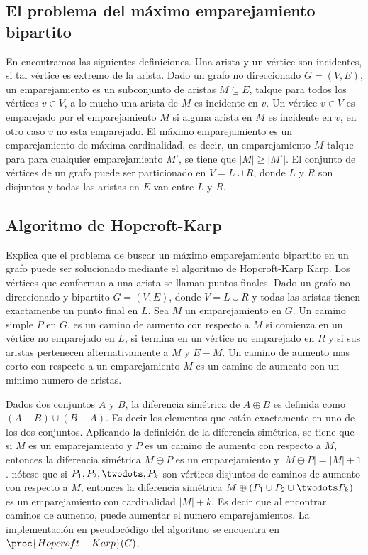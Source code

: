 \subsection{El problema del máximo emparejamiento bipartito}
En \cite{Cormen2009} encontramos las siguientes definiciones. Una arista y un vértice son incidentes, si tal vértice es extremo de la arista. Dado un grafo no direccionado $G=(V,E)$, un emparejamiento es un subconjunto de aristas $M \subseteq E$, talque para todos los vértices $v \in V$, a lo mucho una arista de $M$ es incidente en $v$. Un vértice $v \in V$ es emparejado por el emparejamiento $M$ si alguna arista en $M$ es incidente en $v$, en otro caso $v$ no esta emparejado. El máximo emparejamiento es un emparejamiento de máxima cardinalidad, es decir, un emparejamiento $M$ talque para para cualquier emparejamiento ${M}'$, se tiene que $|M| \geq |{M}'|$. El conjunto de vértices de un grafo puede ser particionado en $V=L \cup R$, donde $L$ y $R$ son disjuntos y todas las aristas en $E$ van entre $L$ y $R$.



\subsection{Algoritmo de Hopcroft-Karp}
\cite{Cormen2009} Explica que el problema de buscar un máximo emparejamiento bipartito en un grafo puede ser solucionado mediante el algoritmo de Hopcroft-Karp Karp. Los vértices que conforman a una arista se llaman puntos finales. Dado un grafo no direccionado y bipartito $G=(V,E)$, donde $V=L \cup R$ y todas las aristas tienen exactamente un punto final en $L$. Sea $M$ un emparejamiento en $G$. Un camino simple $P$ en $G$, es un camino de aumento con respecto a $M$ si comienza en un vértice no emparejado en $L$, si termina en un vértice no emparejado en $R$ y si sus aristas pertenecen alternativamente a $M$ y $E-M$. Un camino de aumento mas corto con respecto a un emparejamiento $M$ es un camino de aumento con un mínimo numero de aristas.

Dados dos conjuntos $A$ y $B$, la diferencia simétrica de $A \oplus B$ es definida como $(A-B) \cup (B-A)$. Es decir los elementos que están exactamente en uno de los dos conjuntos. Aplicando la definición de la diferencia simétrica, se tiene que si $M$ es un emparejamiento y $P$ es un camino de aumento con respecto a $M$, entonces la diferencia simétrica $M \oplus P$ es un emparejamiento y $|M \oplus P| = |M|+1$. nótese que si $P_1,P_2, \twodots ,P_k$ son vértices disjuntos de caminos de aumento con respecto a $M$, entonces la diferencia simétrica $M \oplus (P_1 \cup P_2 \cup  \twodots  P_k)$ es un emparejamiento con cardinalidad $|M|+k$. Es decir que al encontrar caminos de aumento, puede aumentar el numero emparejamientos. La implementación en pseudocódigo del algoritmo se encuentra en $\proc{Hopcroft-Karp}(G)$.

